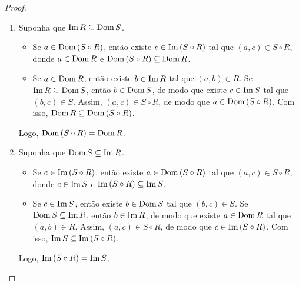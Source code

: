 \begin{proof}
\begin{enumerate}[leftmargin=*, align=left, label=\textbf{(\alph*)}]
\begin{itemize}
                \end{itemize}
            Logo, $(S \circ R)^{-1} = R^{-1} \circ S^{-1}$. \blackproof
            \item Suponha que $\operatorname{Im} R \subseteq \operatorname{Dom} S$.
                \begin{itemize}
                    \item[($\subseteq$)] Se $a \in \operatorname{Dom} \, (S \circ R)$, então existe $c \in \operatorname{Im} \, (S \circ R)$ tal que $(a,c) \in S \circ R$, donde $a \in \operatorname{Dom} R$ e $\operatorname{Dom} \, (S \circ R) \subseteq \operatorname{Dom} R$.
                    \item[($\supseteq$)] Se $a \in \operatorname{Dom} R$, então existe $b \in \operatorname{Im} R$ tal que $(a,b) \in R$. Se $\operatorname{Im} R \subseteq \operatorname{Dom} S$, então $b \in \operatorname{Dom} S$, de modo que existe $c \in \operatorname{Im} S$ tal que $(b,c) \in S$. Assim, $(a,c) \in S \circ R$, de modo que $a \in \operatorname{Dom} \, (S \circ R)$. Com isso, $\operatorname{Dom} R \subseteq \operatorname{Dom} \, (S \circ R)$.
                \end{itemize}
            Logo, $\operatorname{Dom} \, (S \circ R) = \operatorname{Dom} R$. \blackproof
            \item Suponha que $\operatorname{Dom} S \subseteq \operatorname{Im} R$.
                \begin{itemize}
                    \item[($\subseteq$)] Se $c \in \operatorname{Im} \, (S \circ R)$, então existe $a \in \operatorname{Dom} \, (S \circ R)$ tal que $(a,c) \in S \circ R$, donde $c \in \operatorname{Im} S$ e $\operatorname{Im} \, (S \circ R) \subseteq \operatorname{Im} S$.
                    \item[($\supseteq$)] Se $c \in \operatorname{Im} S$, então existe $b \in \operatorname{Dom} S$ tal que $(b,c) \in S$. Se $\operatorname{Dom} S \subseteq \operatorname{Im} R$, então $b \in \operatorname{Im} R$, de modo que existe $a \in \operatorname{Dom} R$ tal que $(a,b) \in R$. Assim, $(a,c) \in S \circ R$, de modo que $c \in \operatorname{Im} \, (S \circ R)$. Com isso, $\operatorname{Im} S \subseteq \operatorname{Im} \, (S \circ R)$.
                \end{itemize}
            Logo, $\operatorname{Im} \, (S \circ R) = \operatorname{Im} S$. \blackproof
        \end{enumerate}
\end{proof}

